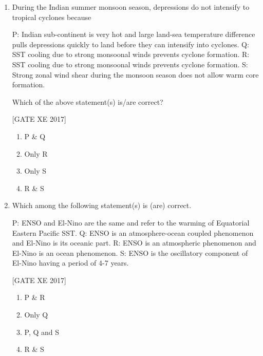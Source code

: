 \documentclass[journal,12pt,onecolumn]{IEEEtran}
\theoremstyle{remark}
\begin{document}
\begin{enumerate}
{\small [ $x,y,f,u,v,p,\rho$ are zonal distance, meridional distance, Coriolis parameter, pressure and density, respectively ]}  

 

\item During the Indian summer monsoon season, depressions do not intensify to tropical cyclones because  

P: Indian sub-continent is very hot and large land-sea temperature difference pulls depressions quickly to land before they can intensify into cyclones.  
Q: SST cooling due to strong monsoonal winds prevents cyclone formation.  
R: SST cooling due to strong monsoonal winds prevents cyclone formation.  
S: Strong zonal wind shear during the monsoon season does not allow warm core formation.  

Which of the above statement(s) is/are correct?  

\hfill [GATE XE 2017]  


\begin{multicols}{2}
\begin{enumerate}
\item P \& Q  
\item Only R  
\item Only S  
\item R \& S  
\end{enumerate}
\end{multicols}


\item Which among the following statement(s) is (are) correct.  

P: ENSO and El-Nino are the same and refer to the warming of Equatorial Eastern Pacific SST.  
Q: ENSO is an atmosphere-ocean coupled phenomenon and El-Nino is its oceanic part.  
R: ENSO is an atmospheric phenomenon and El-Nino is an ocean phenomenon.  
S: ENSO is the oscillatory component of El-Nino having a period of 4-7 years.  

\hfill [GATE XE 2017]  

\begin{multicols}{2}
\begin{enumerate}
\item P \& R  
\item Only Q  
\item P, Q and S  
\item R \& S  
\end{enumerate}
\end{multicols}



\end{enumerate}
\end{document}
